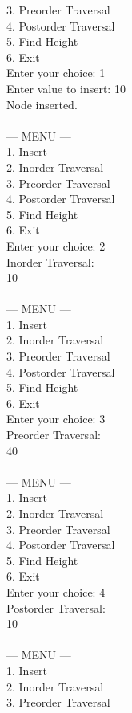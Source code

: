 \documentclass[12pt,a4paper]{article}
\begin{document}
\begin{tcolorbox}[terminalstyle, title=Sample Output]
{3. Preorder Traversal\\
4. Postorder Traversal\\
5. Find Height\\
6. Exit\\
Enter your choice: 1\\
Enter value to insert: 10\\
Node inserted.\\
\\
--- MENU ---\\
1. Insert\\
2. Inorder Traversal\\
3. Preorder Traversal\\
4. Postorder Traversal\\
5. Find Height\\
6. Exit\\
Enter your choice: 2\\
Inorder Traversal:\\
10   \\
\\
--- MENU ---\\
1. Insert\\
2. Inorder Traversal\\
3. Preorder Traversal\\
4. Postorder Traversal\\
5. Find Height\\
6. Exit\\
Enter your choice: 3\\
Preorder Traversal:\\
40   \\
\\
--- MENU ---\\
1. Insert\\
2. Inorder Traversal\\
3. Preorder Traversal\\
4. Postorder Traversal\\
5. Find Height\\
6. Exit\\
Enter your choice: 4\\
Postorder Traversal:\\
10   \\
\\
--- MENU ---\\
1. Insert\\
2. Inorder Traversal\\
3. Preorder Traversal\\
}
\end{tcolorbox}
\end{document}

